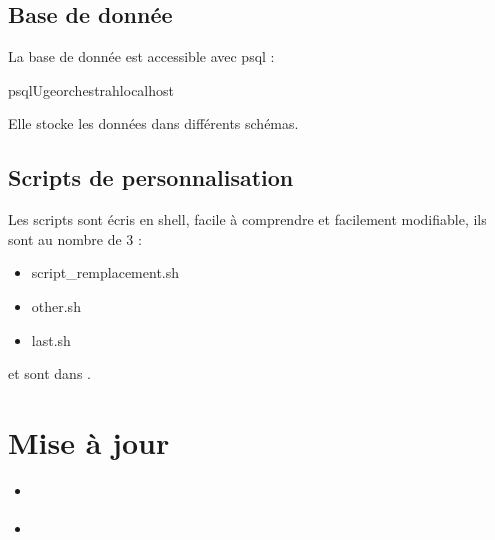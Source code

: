 \documentclass[letterpaper,10pt,french]{sphinxmanual}
\begin{document}
\subsection{Base de donnée}
\label{\detokenize{doc_instal/configuration:base-de-donnee}}
\sphinxAtStartPar
La base de donnée est accessible avec psql :

\begin{sphinxVerbatim}[commandchars=\\\{\}]
psql\PYGZhy{}Ugeorchestra\PYGZhy{}hlocalhost
\end{sphinxVerbatim}

\sphinxAtStartPar
Elle stocke les données dans différents schémas.


\subsection{Scripts de personnalisation}
\label{\detokenize{doc_instal/configuration:scripts-de-personnalisation}}
\sphinxAtStartPar
Les scripts sont écris en shell, facile à comprendre et facilement modifiable, ils sont au nombre de 3 :
\begin{itemize}
\item {} 
\sphinxAtStartPar
script\_remplacement.sh

\item {} 
\sphinxAtStartPar
other.sh

\item {} 
\sphinxAtStartPar
last.sh

\end{itemize}

\sphinxAtStartPar
et sont dans .

\sphinxstepscope


\section{Mise à jour}
\label{\detokenize{doc_instal/maj:mise-a-jour}}\label{\detokenize{doc_instal/maj::doc}}
\begin{sphinxShadowBox}
\begin{itemize}
\item {} 
\sphinxAtStartPar
{}\label{\detokenize{doc_instal/maj:id1}}{\hyperref[\detokenize{doc_instal/maj:introduction}]{}}

\item {} 
\sphinxAtStartPar
{}\label{\detokenize{doc_instal/maj:id2}}{\hyperref[\detokenize{doc_instal/maj:paquets-debians}]{}}

\end{itemize}
\end{sphinxShadowBox}
\end{document}
